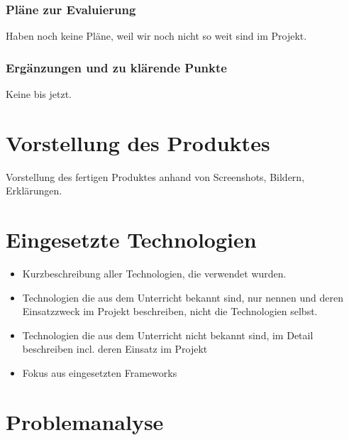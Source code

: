 \subsection{Pläne zur Evaluierung}

Haben noch keine Pläne, weil wir noch nicht so weit sind im Projekt.

\subsection{Ergänzungen und zu klärende Punkte}

Keine bis jetzt.

\chapter{Vorstellung des Produktes}
Vorstellung des fertigen Produktes anhand von Screenshots, Bildern, Erklärungen.

\chapter{Eingesetzte Technologien}
\begin{itemize}
	\item Kurzbeschreibung aller Technologien, die verwendet wurden.
	\item Technologien die aus dem Unterricht bekannt sind, nur nennen und deren  Einsatzzweck im Projekt beschreiben, nicht die Technologien selbst.
	\item Technologien die aus dem Unterricht nicht bekannt sind, im Detail beschreiben incl. deren Einsatz im Projekt
	\item Fokus aus eingesetzten Frameworks
\end{itemize}

\chapter{Problemanalyse}
